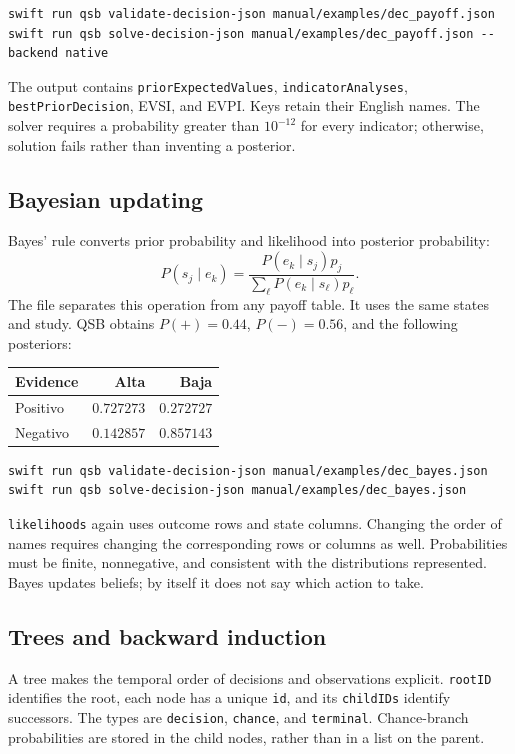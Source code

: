\begin{lstlisting}
swift run qsb validate-decision-json manual/examples/dec_payoff.json
swift run qsb solve-decision-json manual/examples/dec_payoff.json --backend native
\end{lstlisting}
The output contains \texttt{priorExpectedValues}, \texttt{indicatorAnalyses},
\texttt{bestPriorDecision}, EVSI, and EVPI. Keys retain their English names.
The solver requires a probability greater than $10^{-12}$ for every indicator;
otherwise, solution fails rather than inventing a posterior.

\subsection{Bayesian updating}
Bayes' rule converts prior probability and likelihood into posterior probability:
\[
 P(s_j\mid e_k)=\frac{P(e_k\mid s_j)p_j}{\sum_\ell P(e_k\mid s_\ell)p_\ell}.
\]
The file  separates this operation from any payoff table.
It uses the same states and study. QSB obtains $P(+)=0.44$, $P(-)=0.56$,
and the following posteriors:
\begin{center}
\begin{tabular}{lrr}
\toprule
Evidence & Alta & Baja\\
\midrule
Positivo & $0.727273$ & $0.272727$\\
Negativo & $0.142857$ & $0.857143$\\
\bottomrule
\end{tabular}
\end{center}
\begin{lstlisting}
swift run qsb validate-decision-json manual/examples/dec_bayes.json
swift run qsb solve-decision-json manual/examples/dec_bayes.json
\end{lstlisting}
\texttt{likelihoods} again uses outcome rows and state columns. Changing the
order of names requires changing the corresponding rows or columns as well.
Probabilities must be finite, nonnegative, and consistent with the distributions
represented. Bayes updates beliefs; by itself it does not say which action to take.

\subsection{Trees and backward induction}
A tree makes the temporal order of decisions and observations explicit.
\texttt{rootID} identifies the root, each node has a unique \texttt{id}, and
its \texttt{childIDs} identify successors. The types are \texttt{decision},
\texttt{chance}, and \texttt{terminal}. Chance-branch probabilities are stored
in the child nodes, rather than in a list on the parent.


